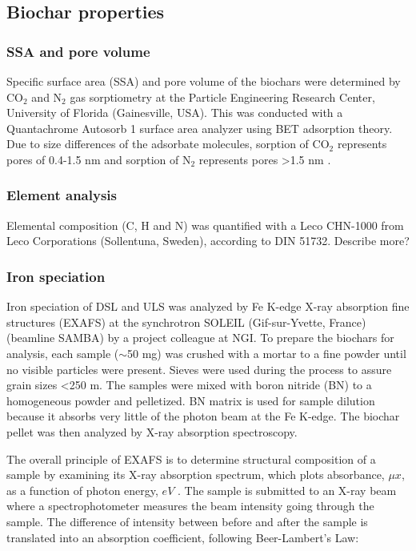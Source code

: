 \subsection{Biochar properties}

\subsubsection{SSA and pore volume}
Specific surface area (SSA) and pore volume of the biochars were determined by $\mathrm{CO_2}$ and $\mathrm{N_2}$ gas sorptiometry at the Particle Engineering Research Center, University of Florida (Gainesville, USA). This was conducted with a Quantachrome Autosorb 1 surface area analyzer using BET adsorption theory. Due to size differences of the adsorbate molecules, sorption of $\mathrm{CO_2}$ represents pores of 0.4-1.5 nm and sorption of $\mathrm{N_2}$ represents pores \textgreater 1.5 nm  \citep{kwon2005}. 

\subsubsection{Element analysis}
Elemental composition (C, H and N) was quantified with a Leco CHN-1000 from Leco Corporations (Sollentuna, Sweden), according to DIN 51732. Describe more? 

\subsubsection{Iron speciation}
Iron speciation of DSL and ULS was analyzed by Fe K-edge X-ray absorption fine structures (EXAFS) at the synchrotron SOLEIL (Gif-sur-Yvette, France) (beamline SAMBA) by a project colleague at NGI. To prepare the biochars for analysis, each sample ($\sim$50 mg) was crushed with a mortar to a fine powder until no visible particles were present. Sieves were used during the process to assure grain sizes \textless 250 \textmu m. The samples were mixed with boron nitride (BN) to a homogeneous powder and pelletized. BN matrix is used for sample dilution because it absorbs very little of the photon beam at the Fe K-edge. The biochar pellet was then analyzed by X-ray absorption spectroscopy.  

The overall principle of EXAFS is to determine structural composition of a sample by examining its X-ray absorption spectrum, which plots absorbance, $\mu x$, as a function of photon energy, $eV$ \citep{vlaica2004exafs}. The sample is submitted to an X-ray beam where a spectrophotometer measures the beam intensity going through the sample. The difference of intensity between before and after the sample is translated into an absorption coefficient, following Beer-Lambert's Law: 

